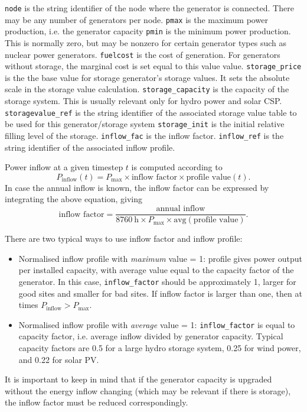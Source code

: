 \documentclass{article}
\begin{document}
\bigskip\noindent
\texttt{node} is the string identifier of the node where the generator is connected. There may be any number of generators per node.
\texttt{pmax} is the maximum power production, i.e. the generator capacity
\texttt{pmin} is the minimum power production. This is normally zero, but may be nonzero for certain generator types such as nuclear power generators.
\texttt{fuelcost} is the cost of generation. For generators without storage, the marginal cost is set equal to this value value.
\texttt{storage\_price} is the the base value for storage generator's storage values. It sets the absolute scale in the storage value calculation.
\texttt{storage\_capacity} is the capacity of the storage system. This is usually relevant only for hydro power and solar CSP.
\texttt{storagevalue\_ref} is the string identifier of the associated storage value table to be used for this generator/storage system
\texttt{storage\_init} is the initial relative filling level of the storage.
\texttt{inflow\_fac} is the inflow factor.
\texttt{inflow\_ref} is the string identifier of the associated inflow profile.

Power inflow at a given timestep $t$ is computed according to
\begin{equation}
	\label{eq:inflow}
	 P_\text{inflow}(t) =  P_\text{max} \times \text{inflow factor} \times \text{profile value}(t) .
\end{equation}
%
In case the annual inflow is known, the inflow factor can be expressed by integrating the above equation, giving
\begin{equation}
	\label{eq:inflow_annual}
	 \text{inflow factor} = \frac{\text{annual inflow}}{8760~\text{h} \times P_\text{max} \times  \text{avg}(\text{profile value})}.
\end{equation}
%

\noindent
There are two typical ways to use inflow factor and inflow profile:
\begin{itemize}
\item Normalised inflow profile with \emph{maximum} value = 1: 
profile gives power output per installed capacity, with average value equal to the capacity factor of the generator. 
In this case, \texttt{inflow\_factor} should be approximately 1, larger for good sites and smaller for bad sites.  If inflow factor is larger than one, then at times $ P_\text{inflow}>P_\text{max}$.
\item Normalised inflow profile with \emph{average} value = 1:  
\texttt{inflow\_factor} is equal to capacity factor, i.e. average inflow divided by generator capacity. Typical capacity factors are  0.5 for a large hydro storage system, 0.25 for wind power, and 0.22 for solar PV.
\end{itemize}
%
It is important to keep in mind that if the generator capacity is upgraded without the energy inflow changing (which may be relevant if there is storage), the inflow factor must be reduced correspondingly. 
\end{document}
